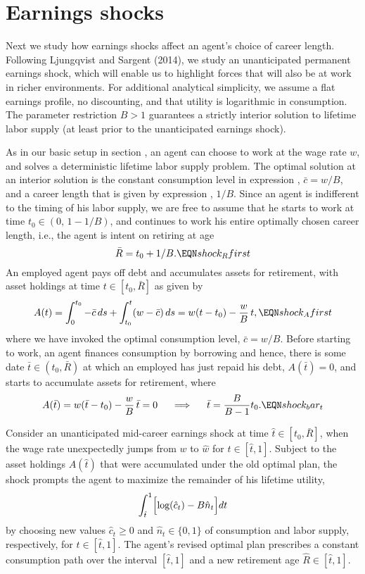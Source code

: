 \section{Earnings shocks}\label{sec:LSshocks}%
Next we study how earnings shocks affect an agent's choice of
career length. Following Ljungqvist and Sargent (2014), we
study an unanticipated permanent earnings shock, which will enable
us to highlight forces that will also be at work in richer
environments. For additional analytical simplicity, we assume a flat
earnings profile, no discounting, and that utility is logarithmic in
consumption. The parameter restriction $B>1$ guarantees a strictly
interior solution to lifetime labor supply (at least prior to
the unanticipated earnings shock).
%
%

As in our basic setup in section , an agent can
choose to work at the wage rate $w$, and solves a deterministic
lifetime labor supply problem. The optimal solution at an interior
solution is the constant consumption level in
expression , $\bar c = w / B$, and a career
length that is given by expression , $1 /B$.
Since an agent is indifferent to the timing of his labor supply,
we are free to assume that he starts to work at time
$t_0 \in (0, \,1-1/B)$,
and continues to work his entire optimally chosen
career length, i.e., the agent is intent on retiring at age
$$
\bar R = t_0 + 1/B.                              \EQN shock_Rfirst
$$
An employed agent pays off debt and accumulates assets for retirement,
with asset holdings at time $t \in [t_0, \bar R]$ as given by
$$
A(t) = \int_0^{t_0} - \bar c \, ds +
      \int_{t_0}^t (w - \bar c)\, ds
    = w (t-t_0 ) - {w  \over B} \,t,              \EQN shock_Afirst
$$
where we have invoked the optimal consumption level, $\bar c = w / B$.
Before starting to work, an agent finances consumption by
borrowing and hence, there is some date $\bar t \in (t_0, \bar R)$
at which an employed has just repaid his debt, $A(\bar t)=0$, and
starts to accumulate assets for retirement, where
$$
A(\bar t) = w (\bar t-t_0 ) - {w  \over B} \,\bar t = 0
\hskip.5cm \Longrightarrow \hskip.5cm \bar t = {B \over B-1} t_0.
                                                 \EQN shock_bar_t
$$

Consider an unanticipated mid-career earnings shock at time
$\hat t \in[t_0, \bar R]$, when the wage rate unexpectedly
jumps from $w$ to $\hat w$ for $t\in [\hat t, 1]$. Subject to
the asset holdings $A(\hat t)$ that were accumulated under the
old optimal plan, the shock prompts the agent to maximize the
remainder of his lifetime utility,
$$
\int_{\hat t}^1 \Bigl[ \log (\hat c_t) - B \hat n_t \Bigr] dt
$$
by choosing new values $\hat c_t \geq 0$ and $\hat n_t \in \{0,1\}$
of consumption and labor supply, respectively, for $t\in [\hat t, 1]$.
The agent's revised optimal plan prescribes a constant consumption
path over the interval $[\hat t, 1]$ and a new retirement
age $\hat R\in [\hat t, 1]$.

